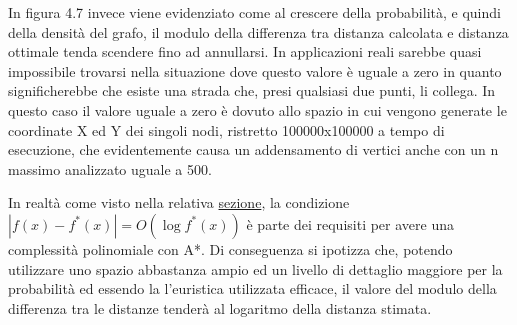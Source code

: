 \documentclass[12pt,a4paper]{report}
\begin{document}
In figura 4.7 invece viene evidenziato come al crescere della probabilità, e quindi della densità del grafo, il modulo della differenza tra distanza calcolata e distanza ottimale tenda scendere fino ad annullarsi. In applicazioni reali sarebbe quasi impossibile trovarsi nella situazione dove questo valore è uguale a zero in quanto significherebbe che esiste una strada che, presi qualsiasi due punti, li collega.
In questo caso il valore uguale a zero è dovuto allo spazio in cui vengono generate le coordinate X ed Y dei singoli nodi, ristretto 100000x100000 a tempo di esecuzione, che evidentemente causa un addensamento di vertici anche con un n massimo analizzato uguale a 500.

In realtà come visto nella relativa \hyperref[se:algo-path-anal]{sezione}, la condizione \textbf{\textit{$|f(x)-f^{*}(x)|=O(\log f^{*}(x))$}} è parte dei requisiti per avere una complessità polinomiale con A*. Di conseguenza si ipotizza che, potendo utilizzare uno spazio abbastanza ampio ed un livello di dettaglio maggiore per la probabilità ed essendo la l'euristica utilizzata efficace, il valore del modulo della differenza tra le distanze tenderà al logaritmo della distanza stimata.





\end{document}
